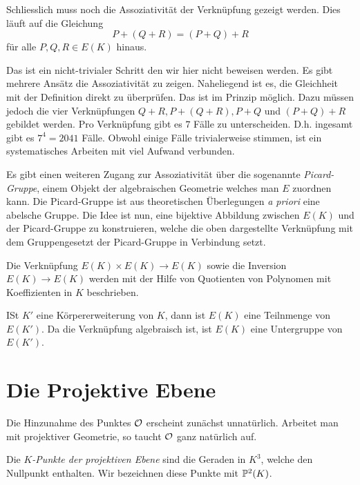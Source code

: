 Schliesslich muss noch die Assoziativität der Verknüpfung gezeigt
werden. Dies läuft auf die Gleichung
$$
P + (Q + R) = (P+Q)+R$$
für alle $P,Q,R\in E(K)$ hinaus.

Das ist ein nicht-trivialer Schritt den wir hier nicht beweisen
werden. Es gibt mehrere Ansätz die Assoziativität zu zeigen.
Naheliegend ist es, die Gleichheit mit der Definition direkt zu
überprüfen. Das ist im Prinzip möglich. Dazu müssen jedoch die vier
Verknüpfungen $Q+R, P+(Q+R), P+Q$ und $(P+Q)+R$ gebildet werden.
Pro Verknüpfung gibt es $7$ Fälle zu unterscheiden. D.h. ingesamt gibt
es $7^4= 2041$ Fälle. Obwohl einige Fälle trivialerweise stimmen, ist
ein systematisches Arbeiten mit viel Aufwand verbunden.


Es gibt einen weiteren Zugang zur Assoziativität über die sogenannte
 \emph{Picard-Gruppe}, einem  Objekt der algebraischen Geometrie
welches man $E$ zuordnen kann. Die Picard-Gruppe ist aus theoretischen
Überlegungen \textit{a priori} eine abelsche Gruppe. Die Idee ist nun, eine
bijektive Abbildung zwischen $E(K)$ und der Picard-Gruppe zu
konstruieren, welche die oben dargestellte Verknüpfung mit dem
Gruppengesetzt der Picard-Gruppe in Verbindung setzt.


\begin{bemerkung}
  Die Verknüpfung $E(K)\times
  E(K)\rightarrow E(K)$ sowie die Inversion $E(K)\rightarrow E(K)$
  werden mit der Hilfe von 
  Quotienten von Polynomen mit Koeffizienten in $K$ beschrieben.

  ISt $K'$ eine Körpererweiterung von $K$, dann ist $E(K)$ eine
  Teilnmenge von $E(K')$. Da die Verknüpfung algebraisch ist, ist
  $E(K)$ eine Untergruppe von $E(K')$.
\end{bemerkung}

\section{Die Projektive Ebene}

Die Hinzunahme des Punktes ${\mathcal O}$ erscheint zunächst unnatürlich.
Arbeitet man mit projektiver Geometrie, so taucht ${\mathcal O}$ ganz natürlich
auf.

\begin{definition}
  Die \emph{$K$-Punkte der projektiven Ebene} sind die Geraden in $K^3$,
  welche den Nullpunkt enthalten. Wir bezeichnen diese Punkte mit
  ${\mathbb{P}}^2(K)$. 
\end{definition}

